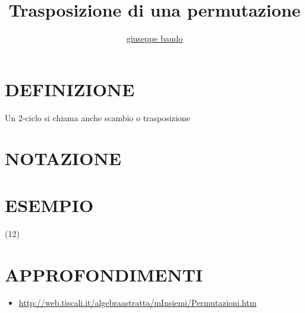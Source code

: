 \documentclass[a4paper,10pt]{article}
\title{Trasposizione di una permutazione}
\author{\href{http://www.baudo.hol.es}{giuseppe baudo}}
\begin{document}
\maketitle

\section{DEFINIZIONE}
Un 2-ciclo si chiama anche scambio o trasposizione

\section{NOTAZIONE}

\section{ESEMPIO}
(12)

\section{APPROFONDIMENTI}
\begin{itemize}
 \item \href{http://web.tiscali.it/algebraastratta/mInsiemi/Permutazioni.htm}{http://web.tiscali.it/algebraastratta/mInsiemi/Permutazioni.htm}
\end{itemize}
\end{document}
